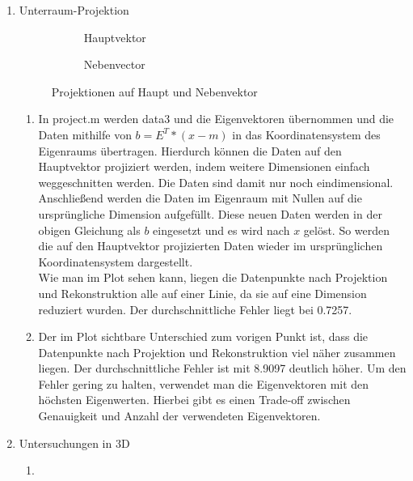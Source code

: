 \documentclass[]{report}
\newlength\figureheight
\newlength\figurewidth
\begin{document}
\begin{enumerate}
\begin{enumerate}
	\end{enumerate}
	\item Unterraum-Projektion
	
		\setlength\figureheight{5cm}
		\setlength{}
		\begin{figure}[tbp!]
			\begin{subfigure}{0.45\textwidth}
				\centering
				
				\caption{Hauptvektor}
				\label{fig:projection1}
			\end{subfigure}
			\qquad
			\begin{subfigure}{0.45\textwidth}
				\centering
				
				\caption{Nebenvector}
				\label{fig:projection2}
			\end{subfigure}	
			\caption{Projektionen auf Haupt und Nebenvektor}
			\label{fig:projection}
		\end{figure}
		
	\begin{enumerate}
		\item
		In project.m werden data3 und die Eigenvektoren übernommen und die Daten mithilfe von $b=E^{T}*(x-m)$ in das Koordinatensystem des Eigenraums übertragen. Hierdurch können die Daten auf den Hauptvektor projiziert werden, indem weitere Dimensionen einfach weggeschnitten werden. Die Daten sind damit nur noch eindimensional.\\
		Anschließend werden die Daten im Eigenraum mit Nullen auf die ursprüngliche Dimension aufgefüllt. Diese neuen Daten werden in der obigen Gleichung als $b$ eingesetzt und es wird nach $x$ gelöst. So werden die auf den Hauptvektor projizierten Daten wieder im ursprünglichen Koordinatensystem dargestellt.\\
		Wie man im Plot sehen kann, liegen die Datenpunkte nach Projektion und Rekonstruktion alle auf einer Linie, da sie auf eine Dimension reduziert wurden. Der durchschnittliche Fehler liegt bei 0.7257.
		\item
		Der im Plot sichtbare Unterschied zum vorigen Punkt ist, dass die Datenpunkte nach Projektion und Rekonstruktion viel näher zusammen liegen. Der durchschnittliche Fehler ist mit 8.9097 deutlich höher. Um den Fehler gering zu halten, verwendet man die Eigenvektoren mit den höchsten Eigenwerten. Hierbei gibt es einen Trade-off zwischen Genauigkeit und Anzahl der verwendeten Eigenvektoren.
	\end{enumerate}
	
	\item Untersuchungen in 3D
	\begin{enumerate}
		\item
		

\end{enumerate}
\end{enumerate}
\end{document}
